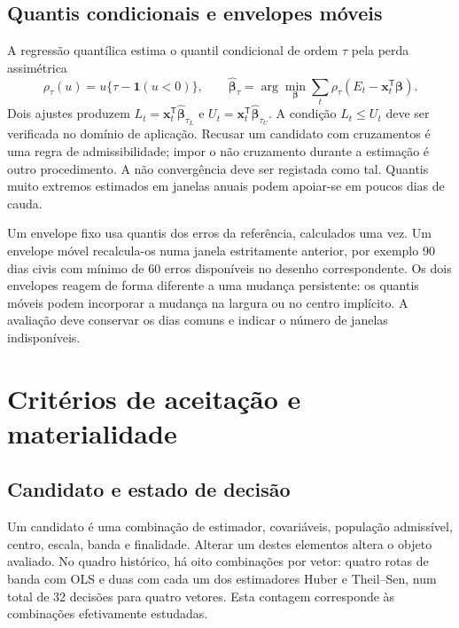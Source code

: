 \subsection{Quantis condicionais e envelopes móveis}
\label{sec:mat-quantis}
A regressão quantílica estima o quantil condicional de ordem $\tau$ pela perda assimétrica\parencite{KoenkerBassett1978}
\begin{equation}
\rho_\tau(u)=u\{\tau-\mathbf1(u<0)\},
\qquad \widehat{\boldsymbol\beta}_\tau
=\arg\min_{\boldsymbol\beta}\sum_t\rho_\tau(E_t-\boldsymbol x_t^{\mathsf T}\boldsymbol\beta).
\label{eq:mat-quantil}
\end{equation}
Dois ajustes produzem $L_t=\boldsymbol x_t^{\mathsf T}\widehat{\boldsymbol\beta}_{\tau_L}$ e $U_t=\boldsymbol x_t^{\mathsf T}\widehat{\boldsymbol\beta}_{\tau_U}$. A condição $L_t\leq U_t$ deve ser verificada no domínio de aplicação. Recusar um candidato com cruzamentos é uma regra de admissibilidade; impor o não cruzamento durante a estimação é outro procedimento\parencite{Chernozhukov2010}. A não convergência deve ser registada como tal. Quantis muito extremos estimados em janelas anuais podem apoiar-se em poucos dias de cauda.

Um envelope fixo usa quantis dos erros da referência, calculados uma vez. Um envelope móvel recalcula-os numa janela estritamente anterior, por exemplo 90 dias civis com mínimo de 60 erros disponíveis no desenho correspondente. Os dois envelopes reagem de forma diferente a uma mudança persistente: os quantis móveis podem incorporar a mudança na largura ou no centro implícito. A avaliação deve conservar os dias comuns e indicar o número de janelas indisponíveis.


\section{Critérios de aceitação e materialidade}
\label{sec:mat-aceitacao}

\subsection{Candidato e estado de decisão}
\label{sec:mat-candidato}
Um candidato é uma combinação de estimador, covariáveis, população admissível, centro, escala, banda e finalidade. Alterar um destes elementos altera o objeto avaliado. No quadro histórico, há oito combinações por vetor: quatro rotas de banda com OLS e duas com cada um dos estimadores Huber e Theil--Sen, num total de 32 decisões para quatro vetores. Esta contagem corresponde às combinações efetivamente estudadas.

